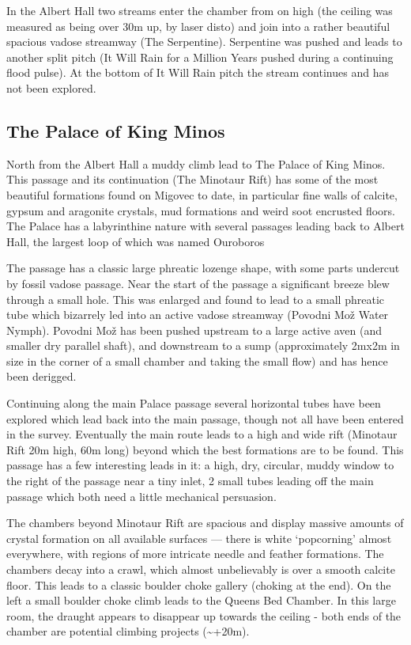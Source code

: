 In the Albert Hall two streams enter the chamber from on high (the
ceiling was measured as being over 30m up, by laser disto) and join
into a rather beautiful spacious vadose streamway (The Serpentine).
Serpentine was pushed and leads to another split pitch (It Will Rain
for a Million Years \textemdash{} pushed during a continuing flood
pulse). At the bottom of It Will Rain pitch the stream continues and
has not been explored.

\subsection{The Palace of King Minos}

North from the Albert Hall a muddy climb lead to The Palace of King
Minos. This passage and its continuation (The Minotaur Rift) has some
of the most beautiful formations found on Migovec to date, in particular
fine walls of calcite, gypsum and aragonite crystals, mud formations
and weird soot encrusted floors. The Palace has a labyrinthine nature
with several passages leading back to Albert Hall, the largest loop
of which was named Ouroboros

The passage has a classic large phreatic lozenge shape, with some
parts undercut by fossil vadose passage. Near the start of the passage
a significant breeze blew through a small hole. This was enlarged
and found to lead to a small phreatic tube which bizarrely led into
an active vadose streamway (Povodni Mo\v{z} \textemdash{} Water Nymph).
Povodni Mo\v{z} has been pushed upstream to a large active aven (and smaller
dry parallel shaft), and downstream to a sump (approximately 2mx2m
in size in the corner of a small chamber and taking the small flow)
and has hence been derigged.

Continuing along the main Palace passage several horizontal tubes
have been explored which lead back into the main passage, though not
all have been entered in the survey. Eventually the main route leads
to a high and wide rift (Minotaur Rift \textemdash{} 20m high, 60m
long) beyond which the best formations are to be found. This passage
has a few interesting leads in it: a high, dry, circular, muddy window
to the right of the passage near a tiny inlet, 2 small tubes leading
off the main passage which both need a little mechanical persuasion.

The chambers beyond Minotaur Rift are spacious and display massive
amounts of crystal formation on all available surfaces --- there is
white `popcorning' almost everywhere, with regions of more intricate
needle and feather formations. The chambers decay into a crawl, which
almost unbelievably is over a smooth calcite floor. This leads to
a classic boulder choke gallery (choking at the end). On the left
a small boulder choke climb leads to the Queens Bed Chamber. In this
large room, the draught appears to disappear up towards the ceiling
- both ends of the chamber are potential climbing projects (\textasciitilde{}+20m).

